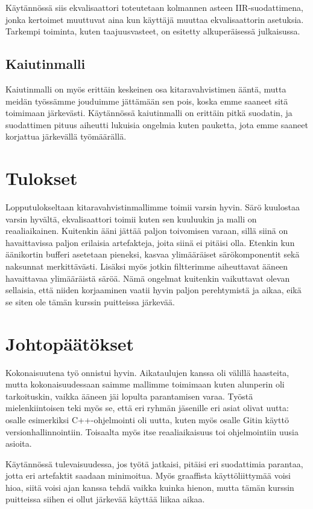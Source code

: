 \documentclass[11pt, a4paper, oneside]{article}
\begin{document}
Käytännössä siis ekvalisaattori toteutetaan kolmannen asteen IIR-suodattimena, jonka kertoimet muuttuvat aina kun käyttäjä muuttaa ekvalisaattorin asetuksia. 
Tarkempi toiminta, kuten taajuusvasteet, on esitetty alkuperäisessä julkaisussa. \cite{fender}

 \subsection{Kaiutinmalli}
 
 Kaiutinmalli on myös erittäin keskeinen osa kitaravahvistimen ääntä, mutta meidän työssämme jouduimme jättämään sen pois, koska emme saaneet sitä toimimaan järkevästi. 
 Käytännössä kaiutinmalli on erittäin pitkä suodatin, ja suodattimen pituus aiheutti lukuisia ongelmia kuten pauketta, jota emme saaneet korjattua järkevällä työmäärällä.
 
\section{Tulokset}

Lopputulokseltaan kitaravahvistinmallimme toimii varsin hyvin. Särö kuulostaa varsin hyvältä, ekvalisaattori toimii kuten sen kuuluukin ja malli on reaaliaikainen. 
Kuitenkin ääni jättää paljon toivomisen varaan, sillä siinä on havaittavissa paljon erilaisia artefakteja, joita siinä ei pitäisi olla. 
Etenkin kun äänikortin bufferi asetetaan pieneksi, kasvaa ylimääräiset särökomponentit sekä naksunnat merkittävästi. 
Lisäksi myös jotkin filtterimme aiheuttavat ääneen havaittavaa ylimääräistä säröä.
Nämä ongelmat kuitenkin vaikuttavat olevan sellaisia, että niiden korjaaminen vaatii hyvin paljon perehtymistä ja aikaa, eikä se siten ole tämän kurssin puitteissa järkevää.


\section{Johtopäätökset}

Kokonaisuutena työ onnistui hyvin. 
Aikataulujen kanssa oli välillä haasteita, mutta kokonaisuudessaan saimme mallimme toimimaan kuten alunperin oli tarkoituskin, vaikka ääneen jäi lopulta parantamisen varaa.
Työstä mielenkiintoisen teki myös se, että eri ryhmän jäsenille eri asiat olivat uutta: osalle esimerkiksi C++-ohjelmointi oli uutta, kuten myös osalle Gitin käyttö versionhallinnointiin. 
Toisaalta myös itse reaaliaikaisuus toi ohjelmointiin uusia asioita.

Käytännössä tulevaisuudessa, jos työtä jatkaisi, pitäisi eri suodattimia parantaa, jotta eri artefaktit saadaan minimoitua.
Myös graaffista käyttöliittymää voisi hioa, siitä voisi ajan kanssa tehdä vaikka kuinka hienon, mutta tämän kurssin puitteissa siihen ei ollut järkevää käyttää liikaa aikaa.





\end{document}
